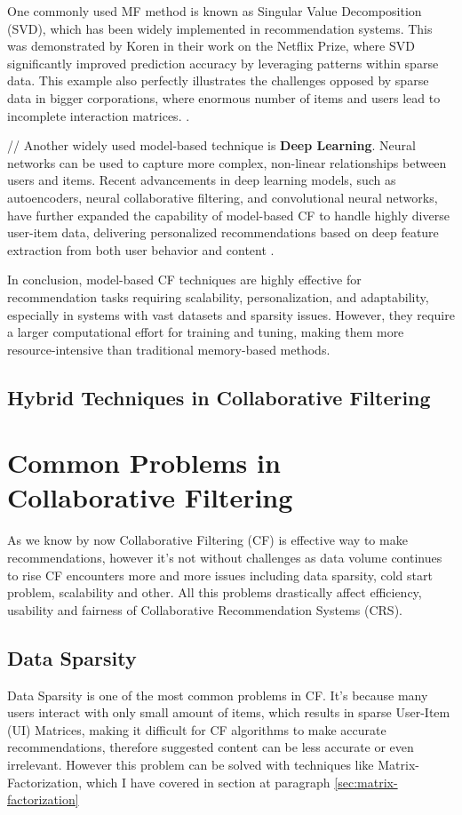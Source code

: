 \documentclass[10pt,a4paper]{article}
\begin{document}
\hspace{0.1cm}

One commonly used MF method is known as Singular Value Decomposition (SVD), which has been widely implemented in recommendation systems. This was demonstrated by Koren in their work on the Netflix Prize, where SVD significantly improved prediction accuracy by leveraging patterns within sparse data. This example also perfectly illustrates the challenges opposed by sparse data in bigger corporations, where enormous number of items and users lead to incomplete interaction matrices. \cite{koren2009bellkor}\cite{baker2005singular}.

\hspace{0.1cm}
//
Another widely used model-based technique is \textbf{Deep Learning}. Neural networks can be used to capture more complex, non-linear relationships between users and items. Recent advancements in deep learning models, such as autoencoders, neural collaborative filtering, and convolutional neural networks, have further expanded the capability of model-based CF to handle highly diverse user-item data, delivering personalized recommendations based on deep feature extraction from both user behavior and content \cite{he2017neural}.

In conclusion, model-based CF techniques are highly effective for recommendation tasks requiring scalability, personalization, and adaptability, especially in systems with vast datasets and sparsity issues. However, they require a larger computational effort for training and tuning, making them more resource-intensive than traditional memory-based methods.

\subsection{Hybrid Techniques in Collaborative Filtering} 

\section{Common Problems in Collaborative Filtering}
As we know by now Collaborative Filtering (CF) is effective way to make recommendations, however it's not without challenges as data volume continues to rise CF encounters more and more issues including data sparsity, cold start problem, scalability and other. All this problems drastically affect efficiency, usability and fairness of Collaborative Recommendation Systems (CRS). 

\subsection{Data Sparsity}
Data Sparsity is one of the most common problems in CF. It's because many users interact with only small amount of items, which results in  sparse User-Item (UI) Matrices, making it difficult for CF algorithms to make accurate recommendations, therefore suggested content can be less accurate or even irrelevant. However this problem can be solved with techniques like Matrix-Factorization, which I have covered in section at paragraph \ref{sec:matrix-factorization} \cite{koren2009matrix}
\end{document}
